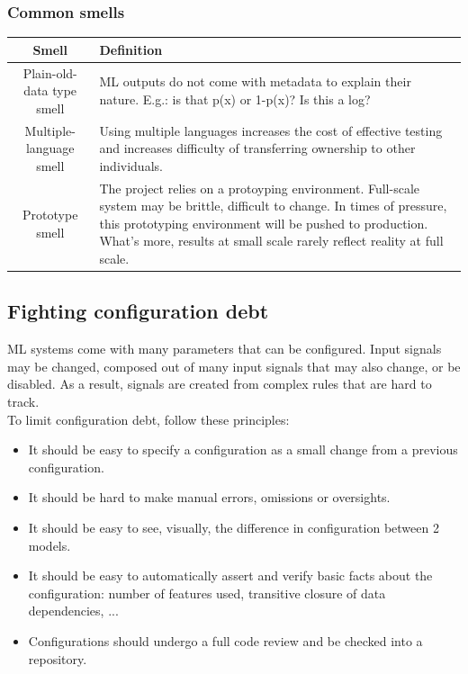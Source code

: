\documentclass[../main.tex]{subfiles}
\begin{document}
\subsubsection{Common smells}
\begin{center}
    \begin{tabular}{ |c|p{10cm}|}
        \hline
        Smell & Definition \\
        \hline
        \hline
        Plain-old-data type smell& ML outputs do not come with metadata to explain their nature.
            E.g.: is that p(x) or 1-p(x)? Is this a log?  \\
        \hline
        Multiple-language smell & Using multiple languages increases the cost of effective testing
            and increases difficulty of transferring ownership to other individuals.\\
        \hline
        Prototype smell & The project relies on a protoyping environment. Full-scale system may be
            brittle, difficult to change. In times of pressure, this prototyping environment will be
            pushed to production. What's more, results at small scale rarely reflect reality at
            full scale.\\
        \hline
    \end{tabular}
\end{center}

\subsection{Fighting configuration debt}
ML systems come with many parameters that can be configured. Input signals may be changed, composed
out of many input signals that may also change, or be disabled. As a result, signals are created from
complex rules that are hard to track. \\
To limit configuration debt, follow these principles:
\begin{itemize}
    \item It should be easy to specify a configuration as a small change from a previous configuration.
    \item It should be hard to make manual errors, omissions or oversights.
    \item It should be easy to see, visually, the difference in configuration between 2 models.
    \item It should be easy to automatically assert and verify basic facts about the configuration:
        number of features used, transitive closure of data dependencies, ...
    \item Configurations should undergo a full code review and be checked into a repository.
\end{itemize}
\end{document}
